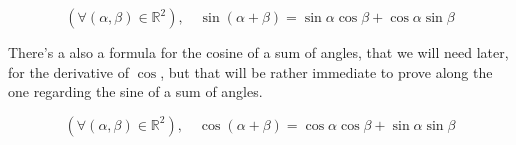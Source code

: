 \documentclass[solutions.tex]{subfiles}
\begin{document}
\begin{theorem}[$\sin(\alpha+\beta)$]
\begin{equation}
	(\forall(\alpha, \beta)\in\mathbb{R}^2),\quad
		\boxed{\sin(\alpha+\beta) = \sin\alpha\cos\beta +\cos\alpha\sin\beta}
	\label{L02E05:thm:sinsum}
\end{equation}
\end{theorem}
There's a also a formula for the cosine of a sum of angles, that we will
need later, for the derivative of $\cos$, but that will be rather immediate
to prove along the one regarding the sine of a sum of angles.
\begin{theorem}[$\cos(\alpha+\beta)$]
\begin{equation}
	(\forall(\alpha, \beta)\in\mathbb{R}^2),\quad
		\boxed{\cos(\alpha+\beta) = \cos\alpha\cos\beta +\sin\alpha\sin\beta}
	\label{L02E05:thm:cossum}
\end{equation}
\end{theorem}
\end{document}
